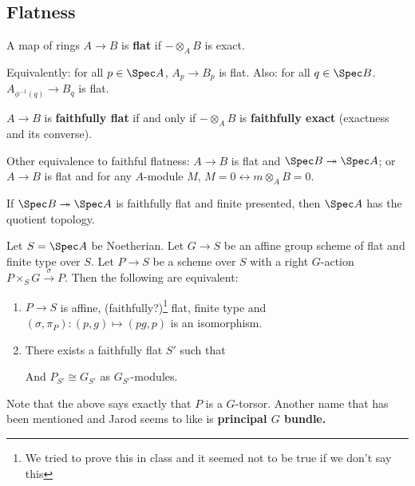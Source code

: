 \documentclass[12pt]{article}
\begin{document}
\subsection{Flatness}
\begin{defn}
	A map of rings $A\to B$ is \textbf{flat} if $-\otimes_A B$ is exact.
\end{defn}
\begin{rmk}
	Equivalently: for all $p\in \Spec A$, $A_p\to B_p$ is flat. Also: for all $q\in\Spec B$. $A_{\phi^{-1}(q)}\to B_q$ is flat.
\end{rmk}
\begin{defn}
	$A\to B$ is \textbf{faithfully flat} if and only if $-\otimes_AB$ is \textbf{faithfully exact} (exactness and its converse).
\end{defn}
\begin{rmk}
	Other equivalence to faithful flatness: $A\to B$ is flat and $\Spec B\twoheadrightarrow\Spec A$; or $A\to B$ 
	is flat and for any $A$-module $M$, $M=0\leftrightarrow m\otimes_AB=0$.
\end{rmk}
\begin{rmk}
	If $\Spec B\twoheadrightarrow\Spec A$ is faithfully flat and finite presented, then $\Spec A$ has the quotient topology.
\end{rmk}

\begin{prop}
	Let $S=\Spec A$ be Noetherian. Let $G\to S$ be an affine group scheme of flat and finite type over $S$. Let $P\to S$ 
	be a scheme over $S$ with a right $G$-action $P\times_SG\xrightarrow{\sigma}P$. Then the following are equivalent:
	\begin{enumerate}
		\item $P\to S$ is affine, (faithfully?)\footnote{We tried to prove this in class and it seemed not to be true if we don't say this}
		flat, finite type and $(\sigma,\pi_P):(p,g)\mapsto (pg,p)$ is an isomorphism.
		\item There exists a faithfully flat $S'$ such that 
		\begin{center}
		\end{center}
		And $P_{S'}\cong G_{S'}$ as $G_{S'}$-modules.
	\end{enumerate}
\end{prop}
\begin{rmk}
	Note that the above says exactly that $P$ is a $G$-torsor. Another name that has been mentioned and Jarod seems to 
	like is \textbf{principal $G$ bundle.}
\end{rmk}
\end{document}
